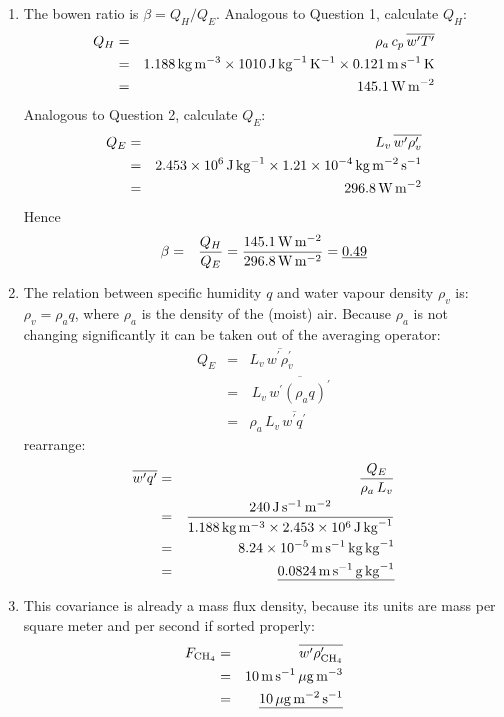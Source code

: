 \documentclass[11pt]{article}
\begin{document}
\begin{enumerate}
\item The bowen ratio is $\beta = Q_H / Q_E$. Analogous to Question 1, calculate $Q_H$:
\begin{eqnarray*}
Q_H &=& \rho_a \, c_p \, \overline{w^{\prime}T^{\prime}} \\
&=& 1.188\,\rm{kg}\,\rm{m}^{-3} \times 1010 \,\rm{J}\,\rm{kg}^{-1}\,\rm{K}^{-1} \times 0.121 \,\rm{m}\,\rm{s}^{-1}\,\rm{K} \\
&=& 145.1  \,\rm{W}\,\rm{m}^{-2}
\end{eqnarray*}
Analogous to Question 2, calculate $Q_E$:
\begin{eqnarray*}
Q_E &=& L_v \, \overline{w^{\prime}\rho_v^{\prime}} \\
&=& 2.453 \times 10^{6} \,\rm{J}\,\rm{kg}^{-1} \times 1.21 \times 10^{-4}\, \rm{kg}\,\rm{m}^{-2}\,\rm{s}^{-1} \\
&=& 296.8 \,\rm{W}\,\rm{m}^{-2}
\end{eqnarray*}
Hence 
\begin{eqnarray*}
\beta &=& \frac{Q_H}{Q_E} = \frac{145.1\,\rm{W}\,\rm{m}^{-2}}{296.8\,\rm{W}\,\rm{m}^{-2}} = \underline{0.49}
\end{eqnarray*}

\item The relation between specific humidity $q$ and water vapour density $\rho_v$ is: $\rho_v = \rho_a q$, where $\rho_a$ is the density of the (moist) air. Because $\rho_a$ is not changing significantly it can be taken out of the averaging operator:
\begin{eqnarray*}
Q_E &=& L_v \, \overline{w^{\prime}\rho_v^{\prime}} \\
    &=& \, L_v\, \overline{w^{\prime}(\rho_a q)^{\prime}} \\
    &=& \rho_a \, L_v\, \overline{w^{\prime}q^{\prime}}
\end{eqnarray*}
rearrange:
\begin{eqnarray*}
\overline{w^{\prime}q^{\prime}} &=& \frac{Q_E}{\rho_a \, L_v}\\
&=& \frac{240\,\rm{J}\,\rm{s}^{-1}\,\rm{m}^{-2}}{1.188\,\rm{kg}\,\rm{m}^{-3}  \times 2.453 \times 10^{6} \,\rm{J}\,\rm{kg}^{-1} } \\
&=& 8.24 \times 10^{-5}\,\rm{m}\,\rm{s}^{-1}\,\rm{kg}\,\rm{kg}^{-1} \\
&=& \underline{0.0824\,\rm{m}\,\rm{s}^{-1}\,\rm{g}\,\rm{kg}^{-1}}
\end{eqnarray*}

\item This covariance is already a mass flux density, because its units are mass per square meter and per second if sorted properly:
\begin{eqnarray*}
F_{\rm{CH}_4} &=& \overline{w^{\prime}\rho_{\rm{CH}_4}^{\prime}} \\
 &=& 10 \,\rm{m}\,\rm{s}^{-1}\,\rm{\mu g}\,\rm{m}^{-3}\\
 &=& \underline{10 \,\rm{\mu g}\,\rm{m}^{-2}\,\rm{s}^{-1}}\\
\end{eqnarray*}

\end{enumerate}
\noindent
\end{document}
